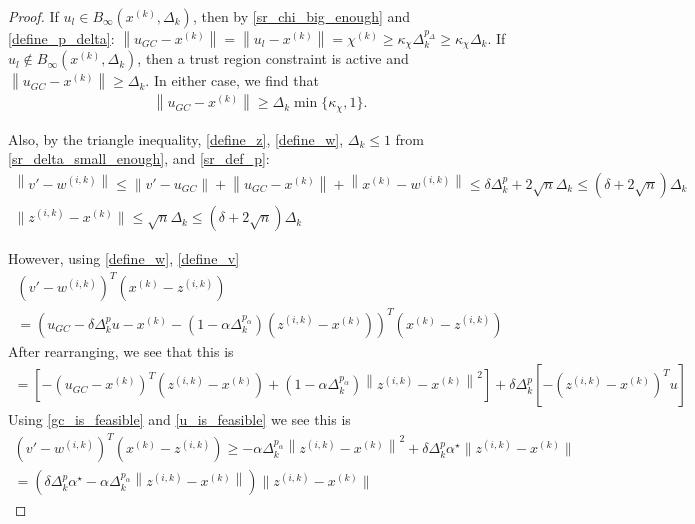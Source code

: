 \documentclass{article}
\theoremstyle{case}
\newcommand{\chik}{{\chi^{(k)}}}
\newcommand{\dk}{\Delta_k}
\newcommand{\minanglealpha}{{ \alpha^{\star} }}
\newcommand{\tr}{{ B_{\infty}\left(\xk, \dk\right) }}
\newcommand{\wik}{{w^{(i, k)}}}
\newcommand{\xk}{{x^{(k)}}}
\newcommand{\zik}{{z^{(i, k)}}}
\begin{document}
\begin{proof}
If $u_l \in \tr$, then by \cref{sr_chi_big_enough} and \cref{define_p_delta}: $\left\|u_{GC} - \xk\right\|  = \left\|u_{l} - \xk\right\| = \chik \ge \kappa_{\chi} \dk^{p_{\Delta}} \ge  \kappa_{\chi} \dk$.
If $u_l \not \in \tr$, then a trust region constraint is active and $\left\|u_{GC} - \xk\right\| \ge \dk$.
In either case, we find that 
\begin{align}
\left\|u_{GC} - \xk\right\| \ge \dk \min\{\kappa_{\chi}, 1 \} \label{gc_big_enough}.
\end{align}


Also, by the triangle inequality, \cref{define_z}, \cref{define_w}, $\dk \le 1$ from \cref{sr_delta_small_enough}, and \cref{sr_def_p}:
\begin{align}
\left\|v' - \wik\right\| \le \left\|v' - u_{GC}\right\| + \left\|u_{GC} - \xk \right\| + \left\|\xk - \wik\right\| \le \delta \dk^p + 2\sqrt{n}\dk \le \left(\delta + 2\sqrt{n}\right)\dk \label{sr_v_minus_w_small} \\
\|\zik - \xk \| \le \sqrt{n}\dk \le \left(\delta + 2\sqrt{n}\right)\dk \label{sr_z_minus_x_small}
\end{align}

However, using \cref{define_w}, \cref{define_v}
\begin{align*}
\left(v' - \wik \right)^T\left(\xk - \zik \right) \\
=\left( u_{GC} - \delta\dk^{p}u - \xk - \left(1 - \alpha\dk^{p_{\alpha}}\right)\left(\zik - \xk\right) \right)^T\left(\xk - \zik \right)
\end{align*}
After rearranging, we see that this is
\begin{align*}
=\left[
-\left( u_{GC}- \xk\right)^T\left(\zik - \xk \right) 
+\left(1 - \alpha\dk^{p_{\alpha}}\right)\left\|\zik - \xk\right\|^2
\right]
+ \delta\dk^{p}\left[ -\left(\zik - \xk\right)^Tu\right]
\end{align*}
Using \cref{gc_is_feasible} and \cref{u_is_feasible} we see this is
\begin{align}
\left(v' - \wik \right)^T\left(\xk - \zik \right)  \ge - \alpha \dk ^{p_{\alpha}} \left\|\zik - \xk\right\|^2
+ \delta\dk^{p} \minanglealpha \|\zik - \xk\| \nonumber \\
= \left(
\delta\dk^{p} \minanglealpha
- \alpha \dk ^{p_{\alpha}} \left\|\zik - \xk\right\|
\right)\|\zik - \xk\| \label{sr_what_to_bound}
\end{align}


\end{proof}
\end{document}
